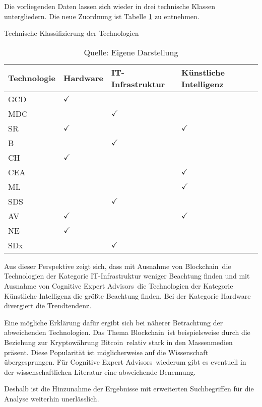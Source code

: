 Die vorliegenden Daten lassen sich wieder in drei technische Klassen untergliedern. Die neue Zuordnung ist Tabelle \ref{tab:class_tech_new} zu entnehmen.

\begin{table}
	\caption{Technische Klassifizierung der Technologien}
	\selectfont
	\centering
	\label{tab:class_tech_new}
	\begin{tabularx}{\linewidth}{X|p{2cm}XX}
		Technologie & Hardware & IT-Infrastruktur & Künstliche Intelligenz \\
		\hline
		\acs{GCD} & $\checkmark$ & & \\
		\hline
		\acs{MDC} & & $\checkmark$ & \\
		\hline
		\acs{SR} & $\checkmark$ & & $\checkmark$ \\
		\hline
		\acs{B} & & $\checkmark$ & \\
		\hline
		\acs{CH} & $\checkmark$ & & \\
		\hline
		\acs{CEA} & & & $\checkmark$ \\
		\hline
		\acs{ML} & & & $\checkmark$ \\
		\hline
		\acs{SDS} & & $\checkmark$ & \\
		\hline
		\acs{AV} & $\checkmark$ & & $\checkmark$ \\
		\hline
		\acs{NE} & $\checkmark$ & & \\
		\hline
		\acs{SDx} & & $\checkmark$ & \\
		\hline
	\end{tabularx}
	\caption*{Quelle: Eigene Darstellung}
\end{table}

Aus dieser Perspektive zeigt sich, dass mit Ausnahme von \glqq Blockchain\grqq~die Technologien der Kategorie IT-Infrastruktur weniger Beachtung finden und mit Ausnahme von \glqq Cognitive Expert Advisors\grqq~die Technologien der Kategorie Künstliche Intelligenz die größte Beachtung finden. Bei der Kategorie Hardware divergiert die Trendtendenz.

Eine mögliche Erklärung dafür ergibt sich bei näherer Betrachtung der abweichenden Technologien. Das Thema \glqq Blockchain\grqq~ist beispielsweise durch die Beziehung zur Kryptowährung \glqq Bitcoin\grqq~relativ stark in den Massenmedien präsent. Diese Popularität ist möglicherweise auf die Wissenschaft übergesprungen. Für \glqq Cognitive Expert Advisors\grqq~wiederum gibt es eventuell in der wissenschaftlichen Literatur eine abweichende Benennung.

Deshalb ist die Hinzunahme der Ergebnisse mit erweiterten Suchbegriffen für die Analyse weiterhin unerlässlich.


